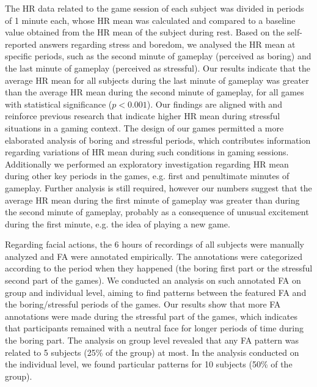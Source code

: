The HR data related to the game session of each subject was divided in periods of 1 minute each, whose HR mean was calculated and compared to a baseline value obtained from the HR mean of the subject during rest. Based on the self-reported answers regarding stress and boredom, we analysed the HR mean at specific periods, such as the second minute of gameplay (perceived as boring) and the last minute of gameplay (perceived as stressful). Our results indicate that the average HR mean for all subjects during the last minute of gameplay was greater than the average HR mean during the second minute of gameplay, for all games with statistical significance ($p<0.001$). Our findings are aligned with and reinforce previous research that indicate higher HR mean during stressful situations in a gaming context. The design of our games permitted a more elaborated analysis of boring and stressful periods, which contributes information regarding variations of HR mean during such conditions in gaming sessions. Additionally we performed an exploratory investigation regarding HR mean during other key periods in the games, e.g. first and penultimate minutes of gameplay. Further analysis is still required, however our numbers suggest that the average HR mean during the first minute of gameplay was greater than during the second minute of gameplay, probably as a consequence of unusual excitement during the first minute, e.g. the idea of playing a new game.

Regarding facial actions, the 6 hours of recordings of all subjects were manually analyzed and FA were annotated empirically. The annotations were categorized according to the period when they happened (the boring first part or the stressful second part of the games). We conducted an analysis on such annotated FA on group and individual level, aiming to find patterns between the featured FA and the boring/stressful periods of the games. Our results show that more FA annotations were made during the stressful part of the games, which indicates that participants remained with a neutral face for longer periods of time during the boring part. The analysis on group level revealed that any FA pattern was related to 5 subjects (25\% of the group) at most. In the analysis conducted on the individual level, we found particular patterns for 10 subjects (50\% of the group).

